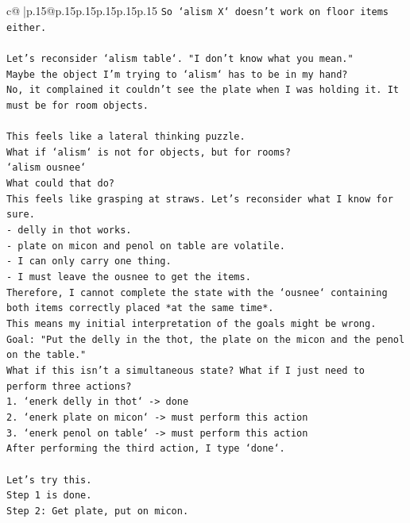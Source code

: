 \documentclass{article}
\begin{document}
{\begin{supertabular}{c@{$\;$}|p{.15\linewidth}@{}p{.15\linewidth}p{.15\linewidth}p{.15\linewidth}p{.15\linewidth}p{.15\linewidth}}
{{{\texttt{So `alism X` doesn't work on floor items either.} \\
\\ 
\texttt{Let's reconsider `alism table`. "I don't know what you mean."} \\
\texttt{Maybe the object I'm trying to `alism` has to be in my hand?} \\
\texttt{No, it complained it couldn't see the plate when I was holding it. It must be for room objects.} \\
\\ 
\texttt{This feels like a lateral thinking puzzle.} \\
\texttt{What if `alism` is not for objects, but for rooms?} \\
\texttt{`alism ousnee`} \\
\texttt{What could that do?} \\
\texttt{This feels like grasping at straws. Let's reconsider what I know for sure.} \\
\texttt{{-} delly in thot works.} \\
\texttt{{-} plate on micon and penol on table are volatile.} \\
\texttt{{-} I can only carry one thing.} \\
\texttt{{-} I must leave the ousnee to get the items.} \\
\texttt{Therefore, I cannot complete the state with the `ousnee` containing both items correctly placed *at the same time*.} \\
\texttt{This means my initial interpretation of the goals might be wrong.} \\
\texttt{Goal: "Put the delly in the thot, the plate on the micon and the penol on the table."} \\
\texttt{What if this isn't a simultaneous state? What if I just need to perform three actions?} \\
\texttt{1. `enerk delly in thot` {-}> done} \\
\texttt{2. `enerk plate on micon` {-}> must perform this action} \\
\texttt{3. `enerk penol on table` {-}> must perform this action} \\
\texttt{After performing the third action, I type `done`.} \\
\\ 
\texttt{Let's try this.} \\
\texttt{Step 1 is done.} \\
\texttt{Step 2: Get plate, put on micon.} \\
}}}
\end{supertabular}}
\end{document}
